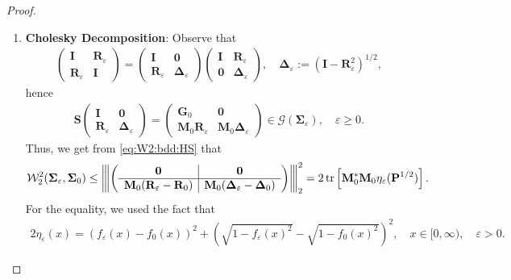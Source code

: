 \documentclass[noinfoline]{imsart}\setcounter{tocdepth}{2}
\newcommand{\m}[1]{\mathbf{#1}}
\renewcommand{\c}[1]{\mathcal{#1}}
\DeclareMathOperator{\tr}{tr}
\newcommand{\vertiii}[1]{{\left\vert\kern-0.25ex\left\vert\kern-0.25ex\left\vert #1 
    \right\vert\kern-0.25ex\right\vert\kern-0.25ex\right\vert}} %
\theoremstyle{plain}
\begin{document}
\begin{proof}
\begin{enumerate}[leftmargin = *]
\item \textbf{Cholesky Decomposition}: Observe that
\begin{align*}
    \left(
    \begin{array}{c|c}
    \m{I} & \m{R}_{\varepsilon} \\
    \hline
    \m{R}_{\varepsilon} & \m{I}
    \end{array}
    \right) = \left(
    \begin{array}{c|c}
    \m{I} & \m{0} \\
    \hline
    \m{R}_{\varepsilon} & \m{\Delta}_{\varepsilon}
    \end{array}
    \right) \left(
    \begin{array}{c|c}
    \m{I} & \m{R}_{\varepsilon} \\
    \hline
    \m{0} & \m{\Delta}_{\varepsilon}
    \end{array}
    \right), \quad \m{\Delta}_{\varepsilon} := (\m{I} - \m{R}_{\varepsilon}^{2})^{1/2},
\end{align*}
hence
\begin{align*}
    \m{S} \left(
    \begin{array}{c|c}
    \m{I} & \m{0} \\
    \hline
    \m{R}_{\varepsilon} & \m{\Delta}_{\varepsilon}
    \end{array}
    \right) = \left(
    \begin{array}{c|c}
    \m{G}_{0} & \m{0} \\
    \hline
    \m{M}_{0} \m{R}_{\varepsilon} & \m{M}_{0} \m{\Delta}_{\varepsilon}
    \end{array}
    \right) \in \c{G}(\m{\Sigma}_{\varepsilon}), \quad \varepsilon \ge 0.
\end{align*}
Thus, we get from \eqref{eq:W2:bdd:HS} that
\begin{align*}
    \c{W}_{2}^{2}(\m{\Sigma}_{\varepsilon}, \m{\Sigma}_{0}) \le \vertiii{\left(
    \begin{array}{c|c}
    \m{0} & \m{0} \\
    \hline
    \m{M}_{0} (\m{R}_{\varepsilon} - \m{R}_{0}) & \m{M}_{0} (\m{\Delta}_{\varepsilon} - \m{\Delta}_{0})
    \end{array}
    \right)}_{2}^{2} = 2 \tr \left[ \m{M}_{0}^{*} \m{M}_{0} \eta_{\varepsilon} (\m{P}^{1/2}) \right].
\end{align*}
For the equality, we used the fact that
\begin{align*}
    2 \eta_{\varepsilon}(x) = (f_{\varepsilon}(x) - f_{0}(x))^{2} + (\sqrt{1 - f_{\varepsilon}(x)^{2}} - \sqrt{1 - f_{0}(x)^{2}})^{2}, \quad x \in [0, \infty), \quad \varepsilon >0.

\end{align*}
\end{enumerate}
\end{proof}
\end{document}
